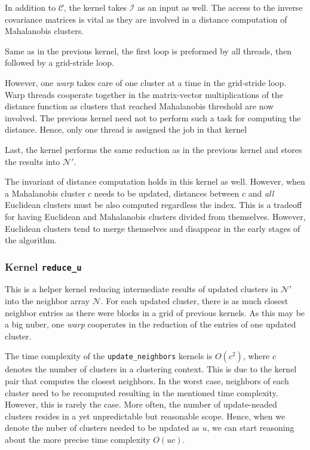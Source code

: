 In addition to $\mathcal{C}$, the kernel takes $\mathcal{I}$ as an input as well. The access to the inverse covariance matrices is vital as they are involved in a distance computation of Mahalanobis clusters. 

Same as in the previous kernel, the first loop is preformed by all threads, then followed by a grid-stride loop. 

However, one \emph{warp} takes care of one cluster at a time in the grid-stride loop. Warp threads cooperate together in the matrix-vector multiplications of the distance function as clusters that reached Mahalanobis threshold are now involved. The previous kernel need not to perform such a task for computing the distance. Hence, only one thread is assigned the job in that kernel

Last, the kernel performs the same reduction as in the previous kernel and stores the results into $\mathcal{N}'$.

\begin{rem}
	The invariant of distance computation holds in this kernel as well. However, when a Mahalanobis cluster $c$ needs to be updated, distances between $c$ and \emph{all} Euclidean clusters must be also computed regardless the index. This is a tradeoff for having Euclidean and Mahalanobis clusters divided from themselves. However, Euclidean clusters tend to merge themselves and disappear in the early stages of the algorithm.
\end{rem}

\subsubsection{Kernel \texttt{reduce\_u}} This is a helper kernel reducing intermediate results of updated clusters in $\mathcal{N}'$ into the neighbor array $\mathcal{N}$. For each updated cluster, there is as much closest neighbor entries as there were blocks in a grid of previous kernels. As this may be a big nuber, one \emph{warp} cooperates in the reduction of the entries of one updated cluster.

\begin{rem}
	The time complexity of the \texttt{update\_neighbors} kernels is $O(c^2)$, where $c$ denotes the number of clusters in a clustering context. This is due to the kernel pair that computes the closest neighbors. In the worst case, neighbors of each cluster need to be recomputed resulting in the mentioned time complexity. However, this is rarely the case. More often, the number of update-neaded clusters resides in a yet unpredictable but reasonable scope. Hence, when we denote the nuber of clusters needed to be updated as $u$, we can start reasoning about the more precise time complexity $O(uc)$.
\end{rem}
